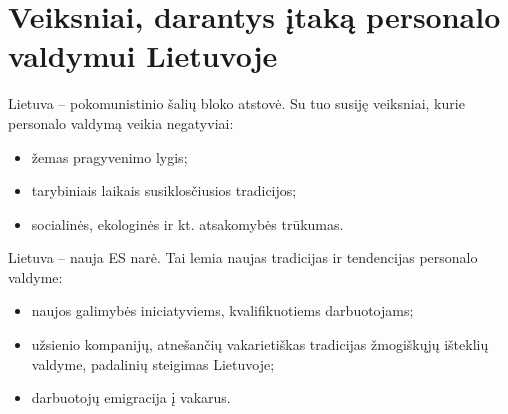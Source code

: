 \section{Veiksniai, darantys įtaką personalo valdymui Lietuvoje}

Lietuva – pokomunistinio šalių bloko atstovė. Su tuo susiję veiksniai,
kurie personalo valdymą veikia negatyviai:
\begin{itemize}
  \item žemas pragyvenimo lygis;
  \item tarybiniais laikais susiklosčiusios tradicijos;
  \item socialinės, ekologinės ir kt. atsakomybės trūkumas.
\end{itemize}

Lietuva – nauja ES narė. Tai lemia naujas tradicijas ir tendencijas
personalo valdyme:
\begin{itemize}
  \item naujos galimybės iniciatyviems, kvalifikuotiems darbuotojams;
  \item užsienio kompanijų, atnešančių vakarietiškas tradicijas
    žmogiškųjų išteklių valdyme, padalinių steigimas Lietuvoje;
  \item darbuotojų emigracija į vakarus.
\end{itemize}

